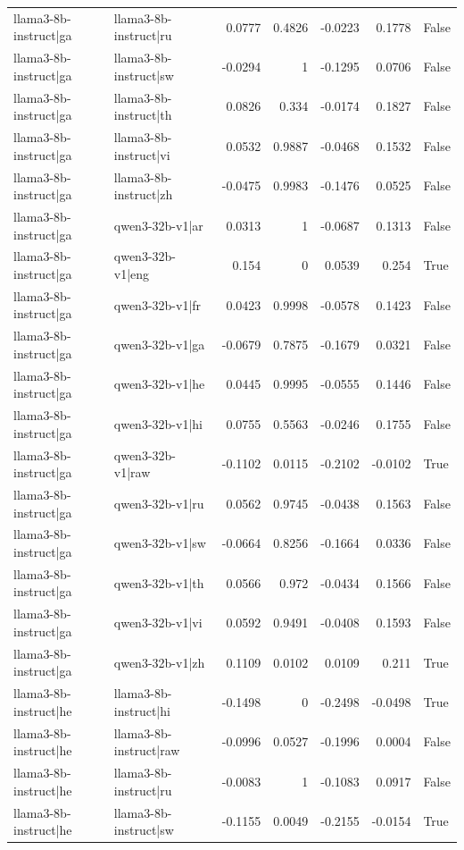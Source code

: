 \begin{table}
\begin{tabular}{l l r r r r l}
llama3-8b-instruct|ga & llama3-8b-instruct|ru & 0.0777 & 0.4826 & -0.0223 & 0.1778 & False \\
llama3-8b-instruct|ga & llama3-8b-instruct|sw & -0.0294 & 1 & -0.1295 & 0.0706 & False \\
llama3-8b-instruct|ga & llama3-8b-instruct|th & 0.0826 & 0.334 & -0.0174 & 0.1827 & False \\
llama3-8b-instruct|ga & llama3-8b-instruct|vi & 0.0532 & 0.9887 & -0.0468 & 0.1532 & False \\
llama3-8b-instruct|ga & llama3-8b-instruct|zh & -0.0475 & 0.9983 & -0.1476 & 0.0525 & False \\
llama3-8b-instruct|ga & qwen3-32b-v1|ar & 0.0313 & 1 & -0.0687 & 0.1313 & False \\
llama3-8b-instruct|ga & qwen3-32b-v1|eng & 0.154 & 0 & 0.0539 & 0.254 & True \\
llama3-8b-instruct|ga & qwen3-32b-v1|fr & 0.0423 & 0.9998 & -0.0578 & 0.1423 & False \\
llama3-8b-instruct|ga & qwen3-32b-v1|ga & -0.0679 & 0.7875 & -0.1679 & 0.0321 & False \\
llama3-8b-instruct|ga & qwen3-32b-v1|he & 0.0445 & 0.9995 & -0.0555 & 0.1446 & False \\
llama3-8b-instruct|ga & qwen3-32b-v1|hi & 0.0755 & 0.5563 & -0.0246 & 0.1755 & False \\
llama3-8b-instruct|ga & qwen3-32b-v1|raw & -0.1102 & 0.0115 & -0.2102 & -0.0102 & True \\
llama3-8b-instruct|ga & qwen3-32b-v1|ru & 0.0562 & 0.9745 & -0.0438 & 0.1563 & False \\
llama3-8b-instruct|ga & qwen3-32b-v1|sw & -0.0664 & 0.8256 & -0.1664 & 0.0336 & False \\
llama3-8b-instruct|ga & qwen3-32b-v1|th & 0.0566 & 0.972 & -0.0434 & 0.1566 & False \\
llama3-8b-instruct|ga & qwen3-32b-v1|vi & 0.0592 & 0.9491 & -0.0408 & 0.1593 & False \\
llama3-8b-instruct|ga & qwen3-32b-v1|zh & 0.1109 & 0.0102 & 0.0109 & 0.211 & True \\
llama3-8b-instruct|he & llama3-8b-instruct|hi & -0.1498 & 0 & -0.2498 & -0.0498 & True \\
llama3-8b-instruct|he & llama3-8b-instruct|raw & -0.0996 & 0.0527 & -0.1996 & 0.0004 & False \\
llama3-8b-instruct|he & llama3-8b-instruct|ru & -0.0083 & 1 & -0.1083 & 0.0917 & False \\
llama3-8b-instruct|he & llama3-8b-instruct|sw & -0.1155 & 0.0049 & -0.2155 & -0.0154 & True \\

\end{tabular}
\end{table}
